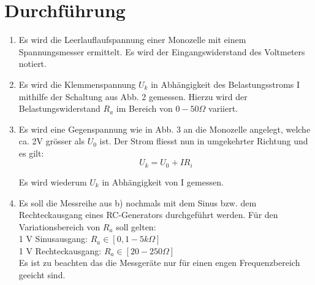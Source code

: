 \section{Durchführung}
\label{sec:Durchführung}

\renewcommand{\labelenumi}{\alph{enumi})}
\begin{enumerate}
    \item Es wird die Leerlauflaufspannung einer Monozelle mit einem Spannungsmesser ermittelt.
    Es wird der Eingangswiderstand des Voltmeters notiert.

    \item Es wird die Klemmenspannung $U_k$ in Abhängigkeit des Belastungsstroms I mithilfe
    der Schaltung aus Abb. 2 gemessen.
    Hierzu wird der Belastungswiderstand $R_a$ im Bereich von $ 0-50 \Omega$ variiert.

    \item Es wird eine Gegenspannung wie in Abb. 3 an die Monozelle angelegt, welche ca. 2V
    grösser als $U_0$ ist. Der Strom fliesst nun in umgekehrter Richtung und es gilt:\\
    \begin{equation}
	    U_k = U_0 + IR_i
    \end{equation}
	    
    
    Es wird wiederum $U_k$ in Abhängigkeit von I gemessen.

    \item Es soll die Messreihe aus b) nochmals mit dem Sinus bzw. dem
    Rechteckausgang eines RC-Generators durchgeführt werden. Für den Variationsbereich
    von $R_a$ soll gelten:\\
    1 V Sinusausgang: $R_a \in [0,1 - 5 k\Omega]$\\
    1 V Rechteckausgang: $R_a \in [20 -250 \Omega]$\\
    Es ist zu beachten das die Messgeräte nur für einen engen Frequenzbereich geeicht sind.
\end{enumerate}
